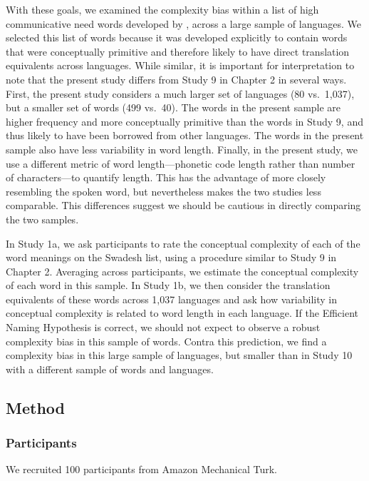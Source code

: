 With these goals, we examined the complexity bias within a list of high communicative need words  developed by  , across a large sample of languages. We selected this list of words because it was developed explicitly to contain words that were conceptually primitive and therefore likely to have direct translation equivalents across languages. While similar, it is important for interpretation to note that the present study differs from Study 9 in Chapter 2 in several ways. First, the present study considers a much larger set of languages (80 vs.\ 1,037), but a smaller set of words (499 vs.\ 40). The words in the present sample are higher frequency and more conceptually primitive than the words in Study 9, and thus likely to have been borrowed from other languages. The words in the present sample also have less variability in word length. Finally, in the present study, we use a different metric of word length---phonetic code length rather than number of characters---to quantify length. This has the advantage of more closely resembling the spoken word, but nevertheless makes the two studies less comparable. This differences suggest we should be cautious in directly comparing the two samples. 

In Study 1a, we ask participants to rate the conceptual complexity of each of the word meanings on the Swadesh list, using a procedure similar to Study 9 in Chapter 2. Averaging across participants, we  estimate the conceptual complexity of each word in this sample.  In Study 1b, we then consider the translation equivalents of these words across 1,037 languages and ask how variability in conceptual complexity is related to word length in each language. If the Efficient Naming Hypothesis is correct, we should not expect to observe a robust complexity bias in this sample of words. Contra this prediction, we find a complexity bias in this large sample of languages, but smaller than in Study 10 with a different sample of words and languages.


\subsection{Method}
\subsubsection{Participants} We recruited 100 participants from Amazon Mechanical Turk.
